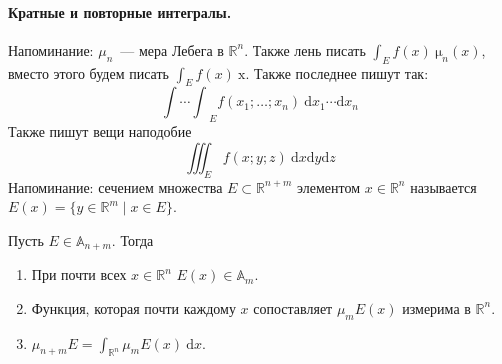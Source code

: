 \documentclass{article}
\begin{document}
    \paragraph{Кратные и повторные интегралы.}
    \begin{remark}
        Напоминание: $\mu_n$~--- мера Лебега в $\mathbb R^n$. Также лень писать $\int_Ef(x)~\mathrm \mu_n(x)$, вместо этого будем писать $\int_Ef(x)~\mathrm x$. Также последнее пишут так:
        $$
        {\int\cdots\int}_Ef(x_1;\ldots;x_n)~\mathrm dx_1\cdots\mathrm dx_n
        $$
        Также пишут вещи наподобие
        $$
        \iiint_Ef(x;y;z)~\mathrm dx\mathrm dy\mathrm dz
        $$
        Напоминание: сечением множества $E\subset\mathbb R^{n+m}$ элементом $x\in\mathbb R^n$ называется $E(x)=\{y\in\mathbb R^m\mid x\in E\}$.
    \end{remark}
    \begin{theorem}
        \label{Восстановление меры множества по мерам сечений}
        \label{Принцип Кавальери}
        Пусть $E\in\mathbb A_{n+m}$. Тогда
        \begin{enumerate}
            \item При почти всех $x\in\mathbb R^n$ $E(x)\in\mathbb A_m$.
            \item Функция, которая почти каждому $x$ сопоставляет $\mu_mE(x)$ измерима в $\mathbb R^n$.
            \item $\mu_{n+m} E=\int_{\mathbb R^n}\mu_mE(x)~\mathrm dx$.
        \end{enumerate}
    \end{theorem}
\end{document}
